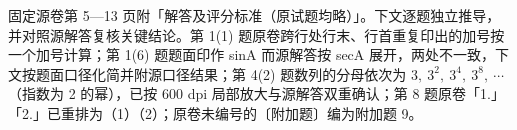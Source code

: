 

\begin{gktip}
固定源卷第 5—13 页附「解答及评分标准（原试题均略）」。下文逐题独立推导，并对照源解答复核关键结论。第 1(1) 题原卷跨行处行末、行首重复印出的加号按一个加号计算；第 1(6) 题题面印作 sinA 而源解答按 secA 展开，两处不一致，下文按题面口径化简并附源口径结果；第 4(2) 题数列的分母依次为 $3,\ 3^2,\ 3^4,\ 3^8,\ \cdots$（指数为 2 的幂），已按 600 dpi 局部放大与源解答双重确认；第 8 题原卷「1.」「2.」已重排为（1）（2）；原卷未编号的〔附加题〕编为附加题 9。
\end{gktip}

